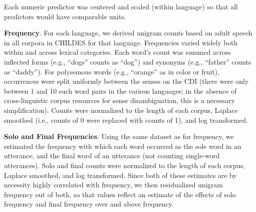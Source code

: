 \documentclass[
   11pt,
       ]{book}
\begin{document}
\begin{table}

\caption{\label{tab:extremes}Items with the highest and lowest values for each predictor in English.}
\centering
{}
\end{table}

Each numeric predictor was centered and scaled (within language) so that all predictors would have comparable units.

\textbf{Frequency}. For each language, we derived unigram counts based on adult speech in all corpora in CHILDES for that language. Frequencies varied widely both within and across lexical categories.
Each word's count was summed across inflected forms (e.g., ``dogs'' counts as ``dog'') and synonyms (e.g., ``father'' counts as ``daddy''). For polysemous words (e.g., ``orange'' as in color or fruit), occurrences were split uniformly between the senses on the CDI (there were only between 1 and 10 such word pairs in the various languages; in the absence of cross-linguistic corpus resources for sense disambiguation, this is a necessary simplification). Counts were normalized to the length of each corpus, Laplace smoothed (i.e., counts of 0 were replaced with counts of 1), and log transformed.

\textbf{Solo and Final Frequencies}. Using the same dataset as for frequency, we estimated the frequency with which each word occurred as the sole word in an utterance, and the final word of an utterance (not counting single-word utterances). Solo and final counts were normalized to the length of each corpus, Laplace smoothed, and log transformed. Since both of these estimates are by necessity highly correlated with frequency, we then residualized unigram frequency out of both, so that values reflect an estimate of the effects of solo frequency and final frequency over and above frequency.
\end{document}
